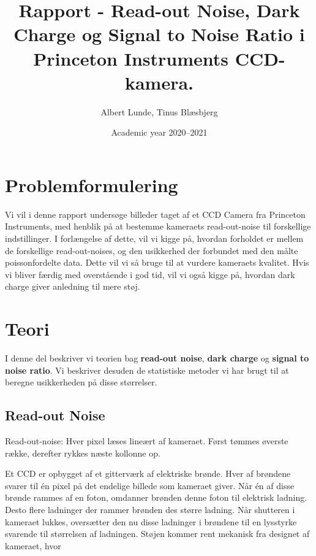 \documentclass[working]{tuftebook}
\title{Rapport - Read-out Noise, Dark Charge og Signal to Noise Ratio i Princeton Instruments CCD-kamera.}
\author{Albert Lunde, Tinus Blæsbjerg}
\date{Academic year 2020--2021}
\begin{document}
    
\renewcommand{\thepage}{\roman{page}}

\pagestyle{fancy}

\begingroup
\let\cleardoublepage\relax
\let\clearpage\relax  
\maketitle
\endgroup


\begingroup
\let\cleardoublepage\relax
\let\clearpage\relax  
\tableofcontents
\endgroup
\let\cleardoublepage\clearpage
\chapter{Problemformulering}
Vi vil i denne rapport undersøge billeder taget af et CCD Camera fra Princeton Instruments, med henblik på at bestemme kameraets read-out-noise til forskellige indstillinger. I forlængelse af dette, vil vi kigge på, hvordan forholdet er mellem de forskellige read-out-noises, og den usikkerhed der forbundet med den målte poissonfordelte data. Dette vil vi så bruge til at vurdere kameraets kvalitet. Hvis vi bliver færdig med overstående i god tid, vil vi også kigge på, hvordan dark charge giver anledning til mere støj.

\chapter{Teori}
I denne del beskriver vi teorien bag \textbf{read-out noise}, \textbf{dark charge} og \textbf{signal to noise ratio}. Vi beskriver desuden de statistiske metoder vi har brugt til at beregne usikkerheden på disse størrelser.
\section{Read-out Noise}
\begin{marginfigure}
    \centering
    \caption{Read-out-noise: Hver pixel læses lineært af kameraet. Først tømmes øverste række, derefter rykkes næste kollonne op.}
    \label{fig:read-out-noise}
\end{marginfigure}
Et CCD er opbygget af et gitterværk af elektriske brønde. Hver af brøndene svarer til én pixel på det endelige billede som kameraet giver. Når én af disse brønde rammes af en foton, omdanner brønden denne foton til elektrisk ladning. Desto flere ladninger der rammer brønden des større ladning. Når shutteren i kameraet lukkes, oversætter den nu disse ladninger i brøndene til en lysstyrke svarende til størrelsen af ladningen. Støjen kommer rent mekanisk fra designet af kameraet, hvor 
\end{document}
